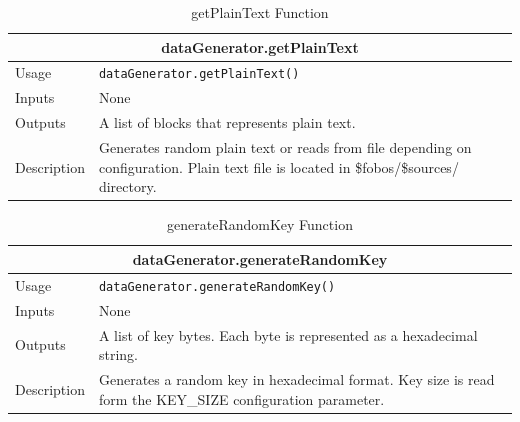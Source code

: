 \documentclass{llncs}
\numberwithin{algorithm}{chapter}
\begin{document}
\begin{table}[H]
\caption{getPlainText Function}
\begin{tabular}{ |p{2cm}||p{11cm}|  }
 \hline
 \multicolumn{2}{|c|}{\cellcolor{teal}\textbf{dataGenerator.getPlainText}} \\
 \hline
 Usage & \texttt{dataGenerator.getPlainText()}\\ \hline
 Inputs & None \\ \hline
 Outputs & A list of blocks that represents plain text.  \\ \hline
 Description & Generates random plain text or reads from file depending on configuration.
 Plain text file is located in \$fobos/\$sources/ directory. \\ \hline
\end{tabular}
\end{table}

\begin{table}[H]
\caption{generateRandomKey Function}
\begin{tabular}{ |p{2cm}||p{11cm}|  }
 \hline
 \multicolumn{2}{|c|}{\cellcolor{teal}\textbf{dataGenerator.generateRandomKey}} \\
 \hline
 Usage & \texttt{dataGenerator.generateRandomKey()}\\ \hline
 Inputs & None \\ \hline
 Outputs & A list of key bytes. Each byte is represented as a hexadecimal string. \\ \hline
 Description & Generates a random key in hexadecimal format. Key size is read form the KEY\_SIZE configuration parameter. \\ \hline
\end{tabular}
\end{table}
\end{document}
